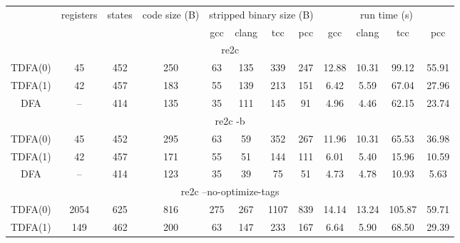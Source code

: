 \documentclass{article}
\theoremstyle{definition}
\begin{document}
\begin{center}
    \bigskip
    \begin{tabular}{|c|ccccccccccc|}
    \hline
    & registers & states & code size (B) & \multicolumn{4}{c}{stripped binary size (B)} & \multicolumn{4}{c|}{run time (s)} \\
    & & &
        & gcc & clang & tcc & pcc
        & gcc & clang & tcc & pcc \\
    \hline \hline
    \multicolumn{12}{|c|}{re2c} \\
    \hline
    TDFA(0) & 45 & 452 & 250 & 63 & 135 & 339 & 247 & 12.88 & 10.31 & 99.12 & 55.91 \\
    TDFA(1) & 42 & 457 & 183 & 55 & 139 & 213 & 151 &  6.42 &  5.59 & 67.04 & 27.96 \\
    DFA     & -- & 414 & 135 & 35 & 111 & 145 &  91 &  4.96 &  4.46 & 62.15 & 23.74 \\
    \hline \hline
    \multicolumn{12}{|c|}{re2c -b} \\
    \hline
    TDFA(0) & 45 & 452 & 295 & 63 & 59 & 352 & 267 & 11.96 & 10.31 & 65.53 & 36.98 \\
    TDFA(1) & 42 & 457 & 171 & 55 & 51 & 144 & 111 &  6.01 &  5.40 & 15.96 & 10.59 \\
    DFA     & -- & 414 & 123 & 35 & 39 &  75 &  51 &  4.73 &  4.78 & 10.93 &  5.63 \\
    \hline \hline
    \multicolumn{12}{|c|}{re2c --no-optimize-tags} \\
    \hline
    TDFA(0) & 2054 & 625 & 816 & 275 & 267 & 1107 & 839 & 14.14 & 13.24 & 105.87 & 59.71 \\
    TDFA(1) &  149 & 462 & 200 &  63 & 147 &  233 & 167 &  6.64 &  5.90 &  68.50 & 29.39 \\

\end{tabular}
\end{center}
\end{document}
